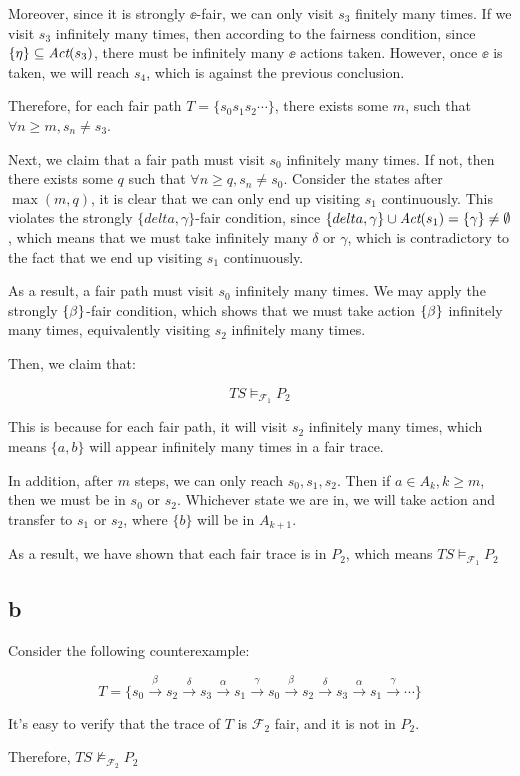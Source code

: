 Moreover, since it is strongly $\ee$-fair, we can only visit $s_3$ finitely many times.
If we visit $s_3$ infinitely many times, then according to the fairness condition,
since $\{\eta\} \subseteq \textit{Act}(s_3)$, there must be infinitely many $\ee$ actions taken.
However, once $\ee$ is taken, we will reach $s_4$, which is against the previous conclusion.

Therefore, for each fair path $T=\{s_0 s_1 s_2 \cdots\}$, there exists some $m$, such that 
$\forall n \ge m, s_n \ne s_3$.

Next, we claim that a fair path must visit $s_0$ infinitely many times.
If not, then there exists some $q$ such that $\forall n \ge q, s_n \ne s_0$.
Consider the states after $\max(m, q)$, it is clear that we can only end up
visiting $s_1$ continuously. This violates the strongly $\{delta, \gamma\}$-fair condition,
since $\{delta, \gamma\} \cup \textit{Act}(s_1) = \{\gamma\} \ne \emptyset$, which means
that we must take infinitely many $\delta$ or $\gamma$, which is contradictory to the fact
that we end up visiting $s_1$ continuously.

As a result, a fair path must visit $s_0$ infinitely many times. We may apply the strongly $\{\beta\}$-fair condition,
which shows that we must take action $\{\beta\}$ infinitely many times, equivalently visiting $s_2$ infinitely many times.

Then, we claim that:

$$
\textit{TS} \models_{\mathcal{F}_1} P_2
$$

This is because for each fair path, it will visit $s_2$ infinitely many times,
which means $\{a, b\}$ will appear infinitely many times in a fair trace.

In addition, after $m$ steps, we can only reach $s_0, s_1, s_2$.
Then if $a \in {A_k}, k \ge m$, then we must be in $s_0$ or $s_2$.
Whichever state we are in, we will take action and transfer to $s_1$ or $s_2$,
where $\{b\}$ will be in $A_{k+1}$.

As a result, we have shown that each fair trace is in $P_2$, which means
$\textit{TS} \models_{\mathcal{F}_1} P_2$

\subsection{b}

Consider the following counterexample:

\newcommand{\xa}{\xrightarrow{\alpha}}
\newcommand{\xb}{\xrightarrow{\beta}}
\newcommand{\xg}{\xrightarrow{\gamma}}
\newcommand{\xd}{\xrightarrow{\delta}}

$$
T = \{s_0 \xb s_2 \xd s_3 \xa s_1 \xg s_0 \xb s_2 \xd s_3 \xa s_1 \xg \cdots\}
$$

It's easy to verify that the trace of $T$ is $\mathcal{F}_2$ fair, and it is not in $P_2$.

Therefore, $\textit{TS} \not\models_{\mathcal{F}_2} P_2$
